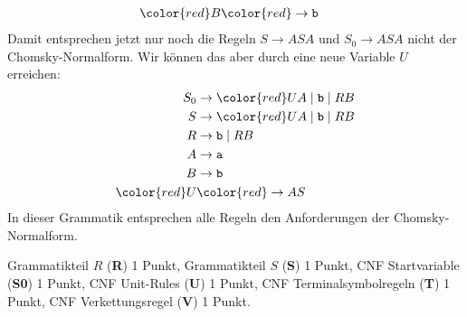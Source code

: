 \begin{loesung}
\begin{enumerate}
\begin{align*}
\color{red}B  &\color{red}\rightarrow \texttt{b}
\end{align*}
Damit entsprechen jetzt nur noch die Regeln $S\rightarrow ASA$ und
$S_0\rightarrow ASA$ nicht der Chomsky-Normalform.
Wir können das aber durch eine neue Variable $U$ erreichen:
\begin{align*}
S_0&\rightarrow {\color{red}U}A \mid  \texttt{b} \mid  RB \\
S  &\rightarrow {\color{red}U}A \mid  \texttt{b} \mid  RB \\
R  &\rightarrow \texttt{b} \mid  RB \\
A  &\rightarrow \texttt{a} \\
B  &\rightarrow \texttt{b} \\
\color{red}U  &\color{red}\rightarrow AS
\end{align*}
In dieser Grammatik entsprechen alle Regeln den Anforderungen der
Chomsky-Normalform.
\qedhere
\end{enumerate}
\end{loesung}

\begin{bewertung}
Grammatikteil $R$ ({\bf R}) 1 Punkt,
Grammatikteil $S$ ({\bf S}) 1 Punkt,
CNF Startvariable ({\bf S0}) 1 Punkt,
CNF Unit-Rules ({\bf U}) 1 Punkt,
CNF Terminalsymbolregeln ({\bf T}) 1 Punkt,
CNF Verkettungsregel ({\bf V}) 1 Punkt.
\end{bewertung}

